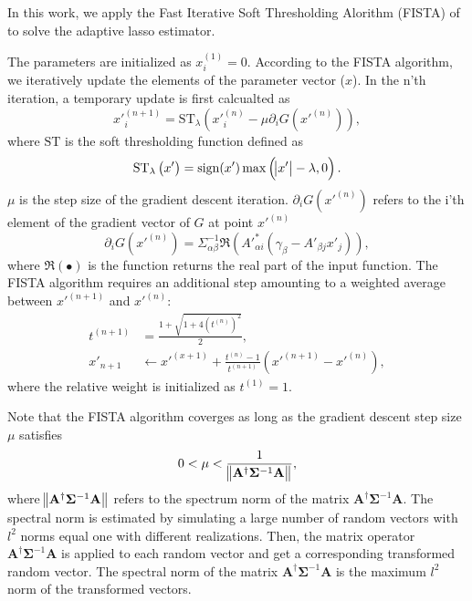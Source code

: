 \documentclass[twocolumn]{aastex62}
\begin{document}
In this work, we apply the Fast Iterative Soft Thresholding Alorithm (FISTA) of \citet{FISTA-Beck2009} to solve
the adaptive lasso estimator.

The parameters are initialized as $x_i^{(1)}=0$. According to the FISTA algorithm, we iteratively
update the elements of the parameter vector ($x$). In the n'th iteration, a temporary update is first calcualted as
\begin{equation}
x'^{(n+1)}_{i}=\mathrm{ST}_{\lambda} \left(x'^{(n)}_{i} -\mu \partial_i G(x'^{(n)})\right),
\end{equation}
where $\mathrm{ST}$ is the soft thresholding function defined as
\begin{equation}
\mathrm{ST}_{\lambda} \left(x'\right) = \mathrm{sign} (x') \max \left(\abs{x'}-\lambda,0\right).
\end{equation}
$\mu$ is the step size of the gradient descent iteration.
$\partial_i G(x'^{(n)})$ refers to the i'th element of the gradient
vector of $G$ at point $x'^{(n)}$
\begin{equation}
\partial_i G(x'^{(n)})=\Sigma^{-1}_{\alpha\beta}\Re\left(A'^{*}_{\alpha i}(\gamma_{\beta}-A'_{\beta j}x'_{j})\right),
\end{equation}
where $\Re\left( \bullet \right)$ is the function returns the real part of the input function.
The FISTA algorithm requires an additional step amounting to a weighted average between
$x'^{(n+1)}$ and $x'^{(n)}$:
\begin{equation}
\begin{split}
t^{(n+1)}&=\frac{1+\sqrt{1+4(t^{(n)})^2}}{2},\\
x'_{n+1} &\leftarrow x'^{(x+1)}+ \frac{t^{(n)}-1}{t^{(n+1)}}(x'^{(n+1)}-x'^{(n)}),
\end{split}
\end{equation}
where the relative weight is initialized as $t^{(1)}=1$.

Note that the FISTA algorithm coverges as long as the gradient descent step size $\mu$ satisfies
\begin{equation}
 0< \mu < \frac{1}{ \norm{\mathbf{A^{\dagger}} \mathbf{\Sigma}^{-1} \mathbf{A} }},
\end{equation}
where $\norm{\mathbf{A^{\dagger}} \mathbf{\Sigma}^{-1} \mathbf{A} }$ refers to the spectrum norm of the matrix
$\mathbf{A^{\dagger}} \mathbf{\Sigma}^{-1} \mathbf{A}$. The spectral norm is estimated by simulating a large number of
random vectors with $l^2$ norms equal one with different realizations. Then, the matrix operator
$\mathbf{A^{\dagger}} \mathbf{\Sigma}^{-1} \mathbf{A}$ is applied to each random vector and get a corresponding transformed
random vector. The spectral norm of the matrix $\mathbf{A^{\dagger}} \mathbf{\Sigma}^{-1} \mathbf{A}$
is the maximum $l^2$ norm of the transformed vectors.
\end{document}
